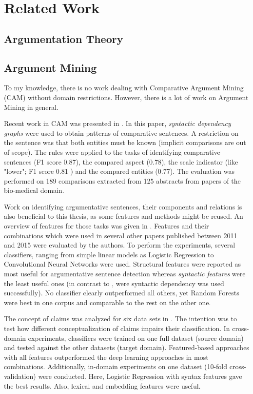 \section{Related Work}
\subsection{Argumentation Theory}
\label{sec:argth}
\subsection{Argument Mining}
\label{sec:argmine}
To my knowledge, there is no work dealing with Comparative Argument Mining (CAM) without domain restrictions. However, there is a lot of work on Argument Mining in general.\newline

Recent work in CAM was presented in \cite{gupta2017identifying}. In this paper, \emph{syntactic dependency graphs} were used to obtain patterns of comparative sentences. A restriction on the sentence was that both entities must be known (implicit comparisons are out of scope).  The rules were applied to the tasks of identifying comparative sentences (F1 score 0.87), the compared aspect (0.78), the scale indicator (like "lower"; F1 score 0.81 ) and the compared entities (0.77). The evaluation was performed on 189 comparisons extracted from 125 abstracts from papers of the bio-medical domain. \newline

Work on identifying argumentative sentences, their components and relations is also beneficial to this thesis, as some features and methods might be reused. An overview of features for those tasks was given in \cite{Aker2017What-works-and-}. Features and their combinations which were used in several other papers published between 2011 and 2015 were evaluated by the authors. To perform the experiments, several classifiers, ranging from simple linear models as Logistic Regression to Convolutional Neural Networks were used. 
Structural features were reported as most useful for argumentative sentence detection whereas \emph{syntactic features} were the least useful ones (in contrast to \cite{gupta2017identifying}, were syntactic dependency was used successfully). No classifier clearly outperformed all others, yet Random Forests were best in one corpus and comparable to the rest on the other one.\newline

The concept of claims was analyzed for six data sets in \cite{Daxenberger2017What-is-the-Ess}. The intention was to test how different conceptualization of claims impairs their classification. In cross-domain experiments, classifiers were trained on one full dataset (source domain) and tested against the other datasets (target domain). Featured-based approaches with all features outperformed the deep learning approaches in most combinations. Additionally, in-domain experiments on one dataset (10-fold cross-validation) were conducted. Here, Logistic Regression with syntax features gave the best results. Also, lexical and embedding features were useful.\newline


